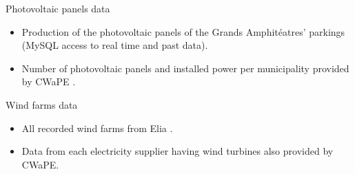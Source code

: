 \documentclass[12pt]{beamer}
\begin{document}
\begin{frame}{Photovoltaic panels data}
    \begin{itemize}
        \item Production of the photovoltaic panels of the \alert{Grands Amphitéatres’ parkings} (MySQL access to real time and past data).
        \item Number of photovoltaic panels and installed power per municipality provided by \alert{CWaPE} \cite{cwape}.
    \end{itemize}
\end{frame}

\begin{frame}{Wind farms data}
    \begin{itemize}
        \item All recorded wind farms from \alert{Elia} \cite{elia_wind}.
        \item Data from each electricity supplier having wind turbines also provided by \alert{CWaPE}.
    \end{itemize}
\end{frame}

\begin{frame}
    \printbibliography
\end{frame}
\end{document}
